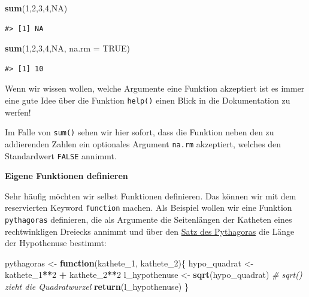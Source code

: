 \documentclass[]{book}
\newenvironment{Shaded}{\begin{snugshade}}{\end{snugshade}}
\newcommand{\KeywordTok}[1]{\textcolor[rgb]{0.13,0.29,0.53}{\textbf{#1}}}
\newcommand{\DataTypeTok}[1]{\textcolor[rgb]{0.13,0.29,0.53}{#1}}
\newcommand{\DecValTok}[1]{\textcolor[rgb]{0.00,0.00,0.81}{#1}}
\newcommand{\StringTok}[1]{\textcolor[rgb]{0.31,0.60,0.02}{#1}}
\newcommand{\CommentTok}[1]{\textcolor[rgb]{0.56,0.35,0.01}{\textit{#1}}}
\newcommand{\OtherTok}[1]{\textcolor[rgb]{0.56,0.35,0.01}{#1}}
\newcommand{\ControlFlowTok}[1]{\textcolor[rgb]{0.13,0.29,0.53}{\textbf{#1}}}
\newcommand{\OperatorTok}[1]{\textcolor[rgb]{0.81,0.36,0.00}{\textbf{#1}}}
\newcommand{\NormalTok}[1]{#1}
\begin{document}
\begin{Shaded}
\begin{Highlighting}[]
\KeywordTok{sum}\NormalTok{(}\DecValTok{1}\NormalTok{,}\DecValTok{2}\NormalTok{,}\DecValTok{3}\NormalTok{,}\DecValTok{4}\NormalTok{,}\OtherTok{NA}\NormalTok{) }
\end{Highlighting}
\end{Shaded}

\begin{verbatim}
#> [1] NA
\end{verbatim}

\begin{Shaded}
\begin{Highlighting}[]
\KeywordTok{sum}\NormalTok{(}\DecValTok{1}\NormalTok{,}\DecValTok{2}\NormalTok{,}\DecValTok{3}\NormalTok{,}\DecValTok{4}\NormalTok{,}\OtherTok{NA}\NormalTok{, }\DataTypeTok{na.rm =} \OtherTok{TRUE}\NormalTok{) }
\end{Highlighting}
\end{Shaded}

\begin{verbatim}
#> [1] 10
\end{verbatim}

Wenn wir wissen wollen, welche Argumente eine Funktion akzeptiert ist es
immer eine gute Idee über die Funktion \texttt{help()} einen Blick in
die Dokumentation zu werfen!

Im Falle von \texttt{sum()} sehen wir hier sofort, dass die Funktion
neben den zu addierenden Zahlen ein optionales Argument \texttt{na.rm}
akzeptiert, welches den Standardwert \texttt{FALSE} annimmt.

\textbf{Eigene Funktionen definieren}

Sehr häufig möchten wir selbst Funktionen definieren. Das können wir mit
dem reservierten Keyword \texttt{function} machen. Als Beispiel wollen
wir eine Funktion \texttt{pythagoras} definieren, die als Argumente die
Seitenlängen der Katheten eines rechtwinkligen Dreiecks annimmt und über
den \href{https://de.wikipedia.org/wiki/Satz_des_Pythagoras}{Satz des
Pythagoras} die Länge der Hypothenuse bestimmt:

\begin{Shaded}
\begin{Highlighting}[]
\NormalTok{pythagoras <-}\StringTok{ }\ControlFlowTok{function}\NormalTok{(kathete_}\DecValTok{1}\NormalTok{, kathete_}\DecValTok{2}\NormalTok{)\{}
\NormalTok{  hypo_quadrat <-}\StringTok{ }\NormalTok{kathete_}\DecValTok{1}\OperatorTok{**}\DecValTok{2} \OperatorTok{+}\StringTok{ }\NormalTok{kathete_}\DecValTok{2}\OperatorTok{**}\DecValTok{2}
\NormalTok{  l_hypothenuse <-}\StringTok{ }\KeywordTok{sqrt}\NormalTok{(hypo_quadrat) }\CommentTok{# sqrt() zieht die Quadratwurzel}
  \KeywordTok{return}\NormalTok{(l_hypothenuse)}
\NormalTok{\}}
\end{Highlighting}
\end{Shaded}
\end{document}
